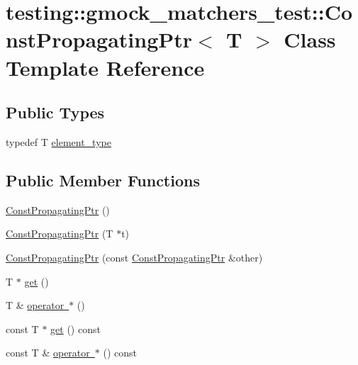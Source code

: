 \hypertarget{classtesting_1_1gmock__matchers__test_1_1ConstPropagatingPtr}{}\section{testing\+::gmock\+\_\+matchers\+\_\+test\+::Const\+Propagating\+Ptr$<$ T $>$ Class Template Reference}
\label{classtesting_1_1gmock__matchers__test_1_1ConstPropagatingPtr}
\subsection*{Public Types}
\begin{DoxyCompactItemize}
\item 
typedef T \mbox{\hyperlink{classtesting_1_1gmock__matchers__test_1_1ConstPropagatingPtr_a2ad1f3127185fadd33eed42627ed5644}{element\+\_\+type}}
\end{DoxyCompactItemize}
\subsection*{Public Member Functions}
\begin{DoxyCompactItemize}
\item 
\mbox{\hyperlink{classtesting_1_1gmock__matchers__test_1_1ConstPropagatingPtr_abdda67deda67ed234da2231fd86f05ed}{Const\+Propagating\+Ptr}} ()
\item 
\mbox{\hyperlink{classtesting_1_1gmock__matchers__test_1_1ConstPropagatingPtr_a06da70663daa274fb8ca3352f039d609}{Const\+Propagating\+Ptr}} (T $\ast$t)
\item 
\mbox{\hyperlink{classtesting_1_1gmock__matchers__test_1_1ConstPropagatingPtr_ae7620c62ba340603968896d5d5400ed1}{Const\+Propagating\+Ptr}} (const \mbox{\hyperlink{classtesting_1_1gmock__matchers__test_1_1ConstPropagatingPtr}{Const\+Propagating\+Ptr}} \&other)
\item 
T $\ast$ \mbox{\hyperlink{classtesting_1_1gmock__matchers__test_1_1ConstPropagatingPtr_a39a09d46453380ec1b8be8ce40adc453}{get}} ()
\item 
T \& \mbox{\hyperlink{classtesting_1_1gmock__matchers__test_1_1ConstPropagatingPtr_a2bca17628b50e37f8ea323b0e80bdc3a}{operator $\ast$}} ()
\item 
const T $\ast$ \mbox{\hyperlink{classtesting_1_1gmock__matchers__test_1_1ConstPropagatingPtr_a92d7c8429246ef33a020e8a3d840b9c3}{get}} () const
\item 
const T \& \mbox{\hyperlink{classtesting_1_1gmock__matchers__test_1_1ConstPropagatingPtr_af081ba59bba8a9453c4537aab846ebaf}{operator $\ast$}} () const
\end{DoxyCompactItemize}


